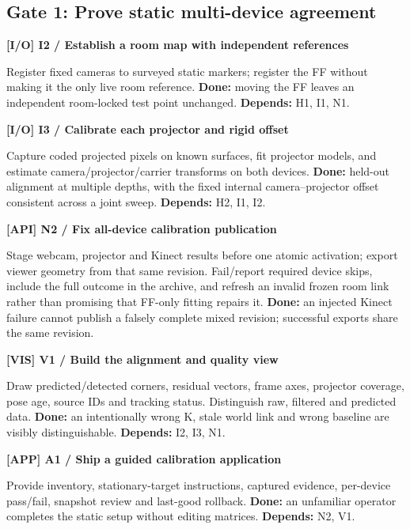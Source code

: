 \documentclass[11pt,a4paper]{article}
\newcommand{\task}[4]{%
  \begin{tcolorbox}[colback=#1!5,colframe=#1,boxrule=0.5pt,
    borderline west={2pt}{0pt}{#1}]
  \textcolor{#1}{\textbf{[#2] #3}}\par #4
  \end{tcolorbox}}
\begin{document}
\subsection{Gate 1: Prove static multi-device agreement}
\task{IO}{I/O}{I2 / Establish a room map with independent references}{
Register fixed cameras to surveyed static markers; register the FF without
making it the only live room reference.
\textbf{Done:} moving the FF leaves an independent room-locked test point
unchanged. \textbf{Depends:} H1, I1, N1.}
\task{IO}{I/O}{I3 / Calibrate each projector and rigid offset}{
Capture coded projected pixels on known surfaces, fit projector models,
and estimate camera/projector/carrier transforms on both devices.
\textbf{Done:} held-out alignment at multiple depths, with the fixed
internal camera--projector offset consistent across a joint sweep.
\textbf{Depends:} H2, I1, I2.}
\task{API}{API}{N2 / Fix all-device calibration publication}{
Stage webcam, projector and Kinect results before one atomic activation;
export viewer geometry from that same revision. Fail/report required
device skips, include the full outcome in the archive, and refresh an
invalid frozen room link rather than promising that FF-only fitting repairs it.
\textbf{Done:} an injected Kinect failure cannot publish a falsely complete
mixed revision; successful exports share the same revision.}
\task{VIS}{VIS}{V1 / Build the alignment and quality view}{
Draw predicted/detected corners, residual vectors, frame axes, projector
coverage, pose age, source IDs and tracking status. Distinguish raw,
filtered and predicted data.
\textbf{Done:} an intentionally wrong K, stale world link and wrong
baseline are visibly distinguishable. \textbf{Depends:} I2, I3, N1.}
\task{APP}{APP}{A1 / Ship a guided calibration application}{
Provide inventory, stationary-target instructions, captured evidence,
per-device pass/fail, snapshot review and last-good rollback.
\textbf{Done:} an unfamiliar operator completes the static setup without
editing matrices. \textbf{Depends:} N2, V1.}
\end{document}
